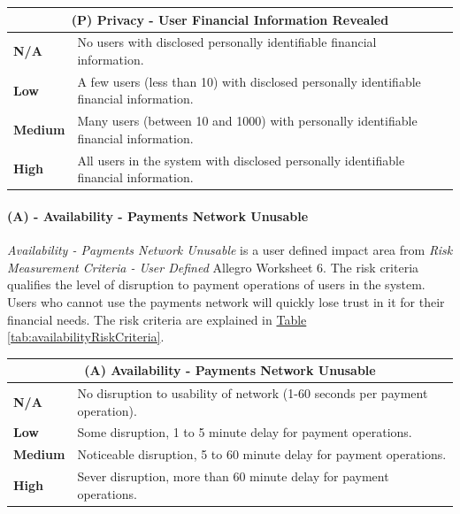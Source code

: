 \documentclass[a4paper,12pt]{article} %
\newcommand{\hypertableref}[1]{\hyperref[#1]{Table \ref{#1}}}
\begin{document}
{\begin{center}
\begin{tabular}{ | l | p{12cm} | }
  \hline
  \multicolumn{2}{|c|}{\textbf{(P) Privacy - User Financial Information Revealed}}
  \\ \hline
  \textbf{N/A} & No users with disclosed personally identifiable financial information.
  \\ \hline
  \textbf{Low} & A few users (less than 10) with disclosed personally identifiable financial information.
  \\ \hline
  \textbf{Medium} & Many users (between 10 and 1000) with personally identifiable financial information.
  \\ \hline
  \textbf{High} & All users in the system with disclosed personally identifiable financial information.
  \\ \hline
\end{tabular}
\end{center}
\label{tab:privacyRiskCriteria}

\paragraph{(A) - Availability - Payments Network Unusable}

\textit{Availability - Payments Network Unusable} is a user defined impact area from \textit{Risk Measurement Criteria - User Defined} Allegro Worksheet 6. The risk criteria qualifies the level of disruption to payment operations of users in the system. Users who cannot use the payments network will quickly lose trust in it for their financial needs. The risk criteria are explained in \hypertableref{tab:availabilityRiskCriteria}.

\begin{center}
\begin{tabular}{ | l | p{12cm} | }
  \hline
  \multicolumn{2}{|c|}{\textbf{(A) Availability - Payments Network Unusable}}
  \\ \hline
  \textbf{N/A} & No disruption to usability of network (1-60 seconds per payment operation).
  \\ \hline
  \textbf{Low} & Some disruption, 1 to 5 minute delay for payment operations.
  \\ \hline
  \textbf{Medium} & Noticeable disruption, 5 to 60 minute delay for payment operations.
  \\ \hline
  \textbf{High} & Sever disruption, more than 60 minute delay for payment operations.
  \\ \hline
\end{tabular}
\end{center}
\label{tab:availabilityRiskCriteria}


}
\end{document}
